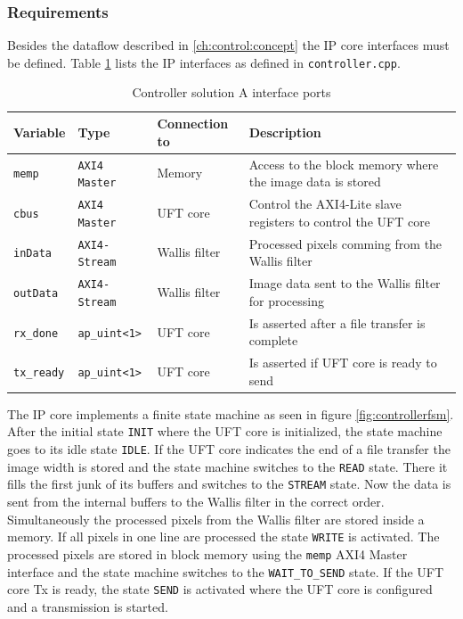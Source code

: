 \subsubsection*{Requirements}
Besides the dataflow described in \ref{ch:control:concept} the IP core
interfaces must be defined. Table \ref{tab:controlleraports} lists the IP
interfaces as defined in \texttt{controller.cpp}.

\begin{table}[b!]
    \centering
    \begin{tabular}{l l l p{8cm}}
        \toprule
        Variable & Type & Connection to & Description \\
        \midrule
        \texttt{memp} & \texttt{AXI4 Master} & Memory &
        Access to the block memory where the image data is stored
        \\
        \texttt{cbus} & \texttt{AXI4 Master} \footnotemark & UFT core &
        Control the AXI4-Lite slave registers to control the UFT core
        \\
        \texttt{inData} & \texttt{AXI4-Stream} & Wallis filter &
        Processed pixels comming from the Wallis filter
        \\
        \texttt{outData} & \texttt{AXI4-Stream} & Wallis filter &
        Image data sent to the Wallis filter for processing
        \\
        \texttt{rx\_done} & \texttt{ap\_uint<1>} & UFT core &
        Is asserted after a file transfer is complete
        \\
        \texttt{tx\_ready} & \texttt{ap\_uint<1>} & UFT core &
        Is asserted if UFT core is ready to send
        \\
        \bottomrule
    \end{tabular}
    \caption{Controller solution A interface ports}
    \label{tab:controlleraports}
\end{table}

The IP core implements a finite state machine as seen in figure 
\ref{fig:controllerfsm}. After the initial state
\texttt{INIT} where the UFT core is initialized, the state machine goes to its
idle state \texttt{IDLE}. If the UFT core indicates the end of a file
transfer the image width is stored and the state machine switches to the 
\texttt{READ} state. There it fills the first junk of its buffers and
switches to the \texttt{STREAM} state. Now the data is sent from the
internal buffers to the Wallis filter in the correct order. Simultaneously the
processed pixels from the Wallis filter are stored inside a memory. If all
pixels in one line are processed the state \texttt{WRITE} is activated. The
processed pixels are stored in block memory using the \texttt{memp} AXI4 Master
interface and the state machine switches to the \texttt{WAIT\_TO\_SEND}
state. If the UFT core Tx is ready, the state \texttt{SEND} is activated
where the UFT core is configured and a transmission is started.

